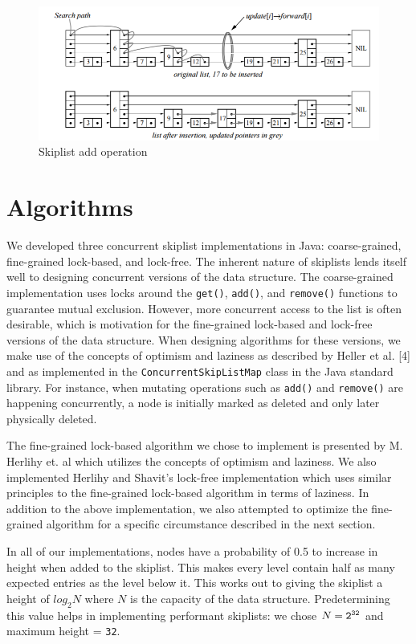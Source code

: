\documentclass[12pt,oneline,a4paper]{ouparticle}
\begin{document}
\begin{figure}
    \centering
    \includegraphics[width=\textwidth]{skiplist}
    \caption{Skiplist add operation \cite{pugh1}}
    \label{fig:skiplist}
\end{figure}

\section{Algorithms}

We developed three concurrent skiplist implementations in Java: coarse-grained, fine-grained lock-based, and lock-free. 
The inherent nature of skiplists lends itself well to designing concurrent versions of the data structure. The coarse-grained implementation uses locks around the {\tt get()}, {\tt add()}, and {\tt remove()} functions to guarantee mutual exclusion. However, more concurrent access to the list is often desirable, which is motivation for the fine-grained lock-based and lock-free versions of the data structure. When designing algorithms for these versions, we make use of the concepts of optimism and laziness as described by Heller et al. [4] and as implemented in the {\tt ConcurrentSkipListMap} class in the Java standard library. For instance, when mutating operations such as {\tt add()} and {\tt remove()} are happening concurrently, a node is initially marked as deleted and only later physically deleted. 

 The fine-grained lock-based algorithm we chose to implement is presented by M. Herlihy et. al \cite{provably} which utilizes the concepts of optimism and laziness. We also implemented Herlihy and Shavit’s lock-free implementation \cite{art} which uses similar principles to the fine-grained lock-based algorithm in terms of laziness. In addition to the above implementation, we also attempted to optimize the fine-grained algorithm for a specific circumstance described in the next section.

In all of our implementations, nodes have a probability of 0.5 to increase in height when added to the skiplist. This makes every level contain half as many expected entries as the level below it. This works out to giving the skiplist a height of $log_{2}N$ where $N$ is the capacity of the data structure. Predetermining this value helps in implementing performant skiplists: we chose $N={\tt2^{32}}$ and maximum height = {\tt 32}. 
\end{document}
